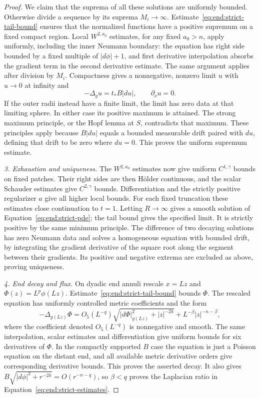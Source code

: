 \begin{proof}
We claim that the suprema of all these solutions are uniformly
bounded.  Otherwise divide a sequence by its suprema $M_i\to
\infty$.  Estimate~\eqref{eq:end:strict-tail-bound} ensures
that the normalized functions have a positive supremum on
a fixed compact region.  Local $W^{2,a_0}$ estimates, for any
fixed $a_0>n$, apply uniformly, including the inner Neumann
boundary: the equation has right side bounded by a fixed
multiple of $|d\phi|+1$, and first derivative interpolation
absorbs the gradient term in the second derivative estimate.
The same argument applies after division by $M_i$.
Compactness gives a nonnegative, nonzero limit $u$ with
$u\to0$ at infinity and
\[
 -\Delta_gu=t_*B|du|,\qquad \partial_\nu u=0.
\]
If the outer radii instead have a finite limit, the limit has
zero data at that limiting sphere.  In either case its positive
maximum is attained.  The strong maximum principle, or the
Hopf lemma at $S$, contradicts that maximum.  These principles
apply because $B|du|$ equals a bounded measurable drift paired
with $du$, defining that drift to be zero where $du=0$.
This proves the uniform supremum estimate.

\medskip\noindent\emph{3. Exhaustion and uniqueness.}
The $W^{2,a_0}$ estimates now give uniform $C^{1,\gamma}$
bounds on fixed patches.  Their right sides are then Hölder
continuous, and the scalar Schauder estimates give
$C^{2,\gamma}$ bounds.  Differentiation and the strictly
positive regularizer $a$ give all higher local bounds.
For each fixed truncation these estimates close continuation
to $t=1$.  Letting $R\to\infty$ gives a smooth solution of
Equation~\eqref{eq:end:strict-pde}; the tail bound gives the
specified limit.  It is strictly positive by the same minimum
principle.  The difference of two decaying solutions has zero
Neumann data and solves a homogeneous equation with bounded
drift, by integrating the gradient derivative of the square
root along the segment between their gradients.  Its positive
and negative extrema are excluded as above, proving uniqueness.

\medskip\noindent\emph{4. End decay and flux.}
On dyadic end annuli rescale $x=Lz$ and
$\Phi(z)=L^p\phi(Lz)$.  Estimate~\eqref{eq:end:strict-tail-bound}
bounds $\Phi$.  The rescaled equation has uniformly controlled
metric coefficients and the form
\[
 -\Delta_{g(Lz)}\Phi
 =O_{5}(L^{-q})\sqrt{|d\Phi|_{g(Lz)}^2+|z|^{-2k}}
                       +L^{-\beta}|z|^{-n-\beta},
\]
where the coefficient denoted $O_5(L^{-q})$ is nonnegative
and smooth.  The same interpolation, scalar estimates and
differentiation give uniform bounds for six derivatives of
$\Phi$.  In the compactly supported $B$ case the equation is
just a Poisson equation on the distant end, and all available
metric derivative orders give corresponding derivative
bounds.  This proves the asserted decay.  It also gives
$B\sqrt{|d\phi|^2+r^{-2k}}=O(r^{-n-q})$, so $\beta<q$
proves the Laplacian ratio in
Equation~\eqref{eq:end:strict-estimates}.


\end{proof}
